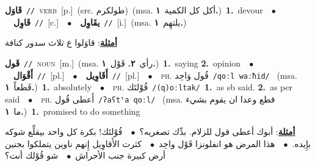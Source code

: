 \documentclass[10pt,a4paper,twoside]{article} %
\begin{document}
\begin{multicols}{2}
{\setlength\topsep{0pt}\textbf{\foreignlanguage{arabic}{قَاوَل}}\ {\color{gray}\texttt{//}\color{black}}\ \textsc{verb}\ [p.]\ (src. \color{gray}\foreignlanguage{arabic}{طولكرم}\color{black})\ \color{gray}(msa. \foreignlanguage{arabic}{أكل كل الكمية}~\foreignlanguage{arabic}{\textbf{١.}})\color{black}\ \textbf{1.}~devour\ \ $\bullet$\ \ \setlength\topsep{0pt}\textbf{\foreignlanguage{arabic}{قَاوِل}}\ {\color{gray}\texttt{//}\color{black}}\ [c.]\ \ $\bullet$\ \ \setlength\topsep{0pt}\textbf{\foreignlanguage{arabic}{يقَاوِل}}\ {\color{gray}\texttt{//}\color{black}}\ [i.]\ \color{gray}(msa. \foreignlanguage{arabic}{يلتهِم}~\foreignlanguage{arabic}{\textbf{١.}})\color{black}\  \begin{flushright}\color{gray}\foreignlanguage{arabic}{\textbf{\underline{\foreignlanguage{arabic}{أمثلة}}}: قاوَلوا ع ثلاث سدور كنافة}\end{flushright}\color{black}} \vspace{2mm}

{\setlength\topsep{0pt}\textbf{\foreignlanguage{arabic}{قَول}}\ {\color{gray}\texttt{//}\color{black}}\ \textsc{noun}\ [m.]\ \color{gray}(msa. \foreignlanguage{arabic}{رأي}~\foreignlanguage{arabic}{\textbf{٢.}}  \foreignlanguage{arabic}{قَوْل}~\foreignlanguage{arabic}{\textbf{١.}})\color{black}\ \textbf{1.}~saying  \textbf{2.}~opinion\ \ $\bullet$\ \ \setlength\topsep{0pt}\textbf{\foreignlanguage{arabic}{أَقْوَال}}\ {\color{gray}\texttt{//}\color{black}}\ [pl.]\ \ $\bullet$\ \ \setlength\topsep{0pt}\textbf{\foreignlanguage{arabic}{أَقَاوِيل}}\ {\color{gray}\texttt{//}\color{black}}\ [pl.]\ \ $\bullet$\ \ \textsc{ph.} \color{gray} \foreignlanguage{arabic}{قُول وَاحِد}\color{black}\ {\color{gray}\texttt{/{\sffamily qoːl waːħid}/}\color{black}}\ \color{gray} (msa. \foreignlanguage{arabic}{قَطعاً}~\foreignlanguage{arabic}{\textbf{١.}})\color{black}\ \textbf{1.}~absolutely\ \ $\bullet$\ \ \textsc{ph.} \color{gray} \foreignlanguage{arabic}{قُوْلتَك}\color{black}\ {\color{gray}\texttt{/{\sffamily (q)oːltak}/}\color{black}}\ \textbf{1.}~as sb said.  \textbf{2.}~as per said\ \ $\bullet$\ \ \textsc{ph.} \color{gray} \foreignlanguage{arabic}{أَعطى قُول}\color{black}\ {\color{gray}\texttt{/{\sffamily ʔaʕtˤa qoːl}/}\color{black}}\ \color{gray} (msa. \foreignlanguage{arabic}{قطع وعدا ان يقوم بشيء ما}~\foreignlanguage{arabic}{\textbf{١.}})\color{black}\ \textbf{1.}~promised to do something\  \begin{flushright}\color{gray}\foreignlanguage{arabic}{\textbf{\underline{\foreignlanguage{arabic}{أمثلة}}}: أبوك أعطى قول للزلام. بدِّك تصغريه؟\ $\bullet$\ \  قُوْلتَك! بكرة كل واحد بيقلِّع شوكه بإِيده.\ $\bullet$\ \  هذا المرض هو انفلونزا قَوْل واحِد\ $\bullet$\ \  كثرت الأَقاوِيل إِنهم ناوين يتملكوا بجنين أرض كبيرة جنب الأحراش\ $\bullet$\ \  شو قُوْلك أنت؟}\end{flushright}\color{black}} \vspace{2mm}


\end{multicols}
\end{document}
